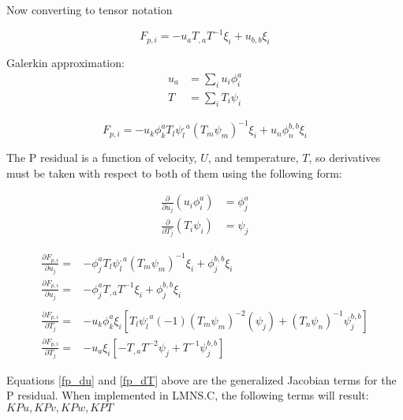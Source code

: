Now converting to tensor notation

\begin{equation}
    F_{p,i} = -u_a T_{,a} T^{-1} \xi_i + u_{b,b}\xi_i
\end{equation}

Galerkin approximation:
\begin{align*}
    u_a &= \sum_i u_i \phi_i^a\\
    T &= \sum_i T_i \psi_i
\end{align*}

\begin{equation}
    F_{p,i} = -u_k \phi_k^a T_l \psi_l^{,a} (T_m \psi_m)^{-1} \xi_i + u_n \phi_n^{b,b} \xi_i
\end{equation}

The P residual is a function of velocity, $U$, and temperature, $T$, so derivatives must be taken with respect to both of them using the following form:

\begin{align*}
    \frac{\partial}{\partial u_j} (u_i \phi_i^a) &= \phi_j^a \\
    \frac{\partial}{\partial T_j} (T_i \psi_i) &= \psi_j
\end{align*}

\begin{align}
    \frac{\partial F_{p,i}}{\partial u_j} = &-\phi_j^{a} T_l \psi_l^{,a} (T_m \psi_m)^{-1} \xi_i + \phi_j^{b,b} \xi_i \nonumber \\
    \frac{\partial F_{p,i}}{\partial u_j} = &-\phi_j^{a} T_{,a} T^{-1} \xi_i + \phi_j^{b,b} \xi_i \label {fp_du}\\ 
    \nonumber \\
    \frac{\partial F_{p,i}}{\partial T_j} = &-u_k \phi_k^a \xi_i \left [ T_l \psi_l^{,a} (-1) (T_m \psi_m)^{-2} (\psi_j) + (T_n \psi_n)^{-1} \psi_j^{b,b} \right ] \nonumber \\
    \frac{\partial F_{p,i}}{\partial T_j} = &-u_a \xi_i \left [ -T_{,a} T^{-2} \psi_j + T^{-1} \psi_j^{b,b} \right ] \label{fp_dT}
\end{align}

Equations \ref{fp_du} and \ref{fp_dT} above are the generalized Jacobian terms for the P residual. When implemented in LMNS.C, the following terms will result:\\
$KPu, KPv, KPw, KPT$

\newpage
